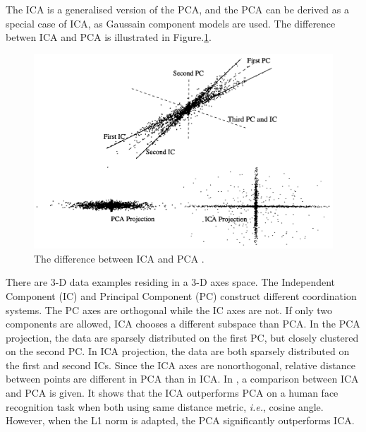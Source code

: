 The ICA is a generalised version of the PCA, and the PCA can be derived as a special case of ICA, as Gaussain component models are used. The difference betwen ICA and PCA is illustrated in \mbox{Figure}.\ref{fig:icaVSpca}.
\begin{figure}[ht]
 \begin{center}
\includegraphics[width=0.7\columnwidth]{ch2/figures/icaVSpca.jpg}
  \caption{The difference between ICA and PCA \cite{Bartlett2002}.}
\label{fig:icaVSpca}
 \end{center}
\end{figure} 
There are 3-D data examples residing in a 3-D axes space. The Independent Component (IC) and Principal Component (PC) construct different coordination systems. The PC axes are orthogonal while the IC axes are not. If only two components are allowed, ICA chooses a different subspace than PCA. In the PCA projection, the data are sparsely distributed on the first PC, but closely clustered on the second PC. In ICA projection, the data are both sparsely distributed on the first and second ICs. Since the ICA axes are nonorthogonal, relative distance between points are different in PCA than in ICA. In \cite{Baek2002}, a comparison between ICA and PCA is given. It shows that the ICA outperforms PCA on a human face recognition task when both using same distance metric, \textit{i.e.}, cosine angle. However, when the L1 norm is adapted, the PCA significantly outperforms ICA.

